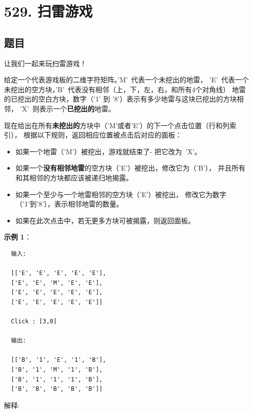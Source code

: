 \newpage
\section{529. 扫雷游戏}
\label{leetcode:529}

\subsection{题目}

让我们一起来玩扫雷游戏！

给定一个代表游戏板的二维字符矩阵。'M' 代表一个未挖出的地雷，
'E' 代表一个未挖出的空方块，'B' 代表没有相邻（上，下，左，右，和所有4个对角线）
地雷的已挖出的空白方块，数字（'1' 到 '8'）表示有多少地雷与这块已挖出的方块相邻，
'X' 则表示一个\textbf{已挖出的}地雷。

现在给出在所有\textbf{未挖出的}方块中（'M'或者'E'）的下一个点击位置（行和列索引），
根据以下规则，返回相应位置被点击后对应的面板：

\begin{itemize}
  \item 如果一个地雷（'M'）被挖出，游戏就结束了- 把它改为 'X'。
  \item 如果一个\textbf{没有相邻地雷}的空方块（'E'）被挖出，修改它为（'B'），
    并且所有和其相邻的方块都应该被递归地揭露。
  \item 如果一个至少与一个地雷相邻的空方块（'E'）被挖出，
    修改它为数字（'1'到'8'），表示相邻地雷的数量。
  \item 如果在此次点击中，若无更多方块可被揭露，则返回面板。
\end{itemize}

\textbf{示例 1}：

\begin{verbatim}
  输入: 

  [['E', 'E', 'E', 'E', 'E'],
  ['E', 'E', 'M', 'E', 'E'],
  ['E', 'E', 'E', 'E', 'E'],
  ['E', 'E', 'E', 'E', 'E']]

  Click : [3,0]

  输出: 

  [['B', '1', 'E', '1', 'B'],
  ['B', '1', 'M', '1', 'B'],
  ['B', '1', '1', '1', 'B'],
  ['B', 'B', 'B', 'B', 'B']]
\end{verbatim}

解释:

